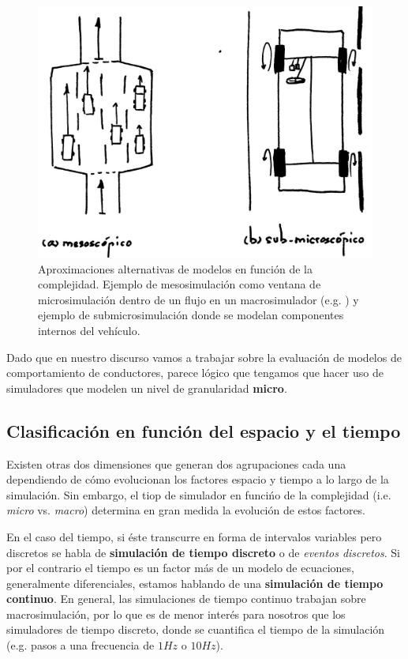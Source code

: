 \begin{figure}
	\centering
	\includegraphics{images/mesoscopic-and-submicroscopic-simulation}
	\caption{Aproximaciones alternativas de modelos en función de la complejidad. Ejemplo de mesosimulación como ventana de microsimulación dentro de un flujo en un macrosimulador (e.g. \cite{munoz2001integrated}) y ejemplo de submicrosimulación donde se modelan componentes internos del vehículo.}
	\label{fig:mesoscopic-and-submicroscopic-simulation}
\end{figure}

Dado que en nuestro discurso vamos a trabajar sobre la evaluación de modelos de comportamiento de conductores, parece lógico que tengamos que hacer uso de simuladores que modelen un nivel de granularidad \textbf{micro}.

\subsection{Clasificación en función del espacio y el tiempo}

Existen otras dos dimensiones que generan dos agrupaciones cada una dependiendo de cómo evolucionan los factores espacio y tiempo a lo largo de la simulación. Sin embargo, el tiop de simulador en funcińo de la complejidad (i.e. \textit{micro} vs. \textit{macro}) determina en gran medida la evolución de estos factores.

En el caso del tiempo, si éste transcurre en forma de intervalos variables pero discretos se habla de \textbf{simulación de tiempo discreto} o de \textit{eventos discretos}. Si por el contrario el tiempo es un factor más de un modelo de ecuaciones, generalmente diferenciales, estamos hablando de una \textbf{simulación de tiempo continuo}. En general, las simulaciones de tiempo continuo trabajan sobre macrosimulación, por lo que es de menor interés para nosotros que los simuladores de tiempo discreto, donde se cuantifica el tiempo de la simulación (e.g. pasos a una frecuencia de $1Hz$ o $10Hz$).

